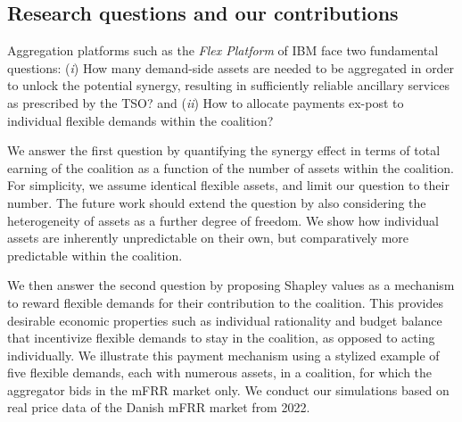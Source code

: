 \documentclass[conference]{IEEEtran}
\begin{document}
\subsection{Research questions and our contributions}
\vspace{-1mm}
Aggregation platforms such as the \textit{Flex Platform} of IBM face two fundamental questions: (\textit{i}) How many demand-side assets are needed to be aggregated in order to unlock the potential synergy,  resulting in sufficiently reliable ancillary services as prescribed by the TSO? and (\textit{ii}) How to allocate payments ex-post to individual flexible demands within the coalition?

We answer the first question by quantifying the synergy effect in terms of total earning of the coalition as a function of the number of assets within the coalition. For simplicity, we assume identical flexible assets, and limit our question to their number. The future work should extend the question by also considering the heterogeneity  of assets as a further degree of freedom. We show how individual assets are inherently unpredictable on their own, but comparatively more predictable within the coalition.

We then answer the second question by proposing Shapley values \cite{shapley1997value} as a mechanism to reward flexible demands for their contribution to the coalition. This provides desirable economic properties such as individual rationality and budget balance that incentivize flexible demands to stay in the coalition, as opposed to acting individually. We illustrate this payment mechanism  using a stylized example of five flexible demands, each with numerous assets, in a coalition, for which the aggregator bids in the mFRR market only. We conduct our simulations based on real price data of the Danish mFRR market from 2022.




\end{document}
